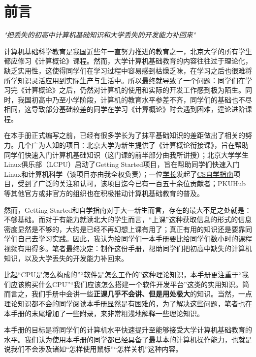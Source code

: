 \documentclass[../main.tex]{subfiles}
\begin{document}
\chapter{前言}

\begin{center}
  \emph{"把丢失的初高中计算机基础知识和大学丢失的开发能力补回来"}
\end{center}

计算机基础科学教育是我国近些年一直努力推进的教育之一，北京大学的所有学生都应修习《计算概论》课程。然而，大学计算机基础教育的内容往往过于理论化，缺乏实用性，这使得同学们在学习过程中容易感到枯燥乏味，在学习之后也很难将所学知识灵活应用到实际生产与生活中。所以最终就导致了一个问题：同学们在学习完《计算概论》之后，仍然对计算机的使用和实际的开发工作感到极为陌生。同时，我国初高中乃至小学阶段，计算机的教育水平参差不齐，同学们的基础也不尽相同，这导致部分基础较差的同学在学习《计算概论》时会遇到困难，遑论进阶课程。

在本手册正式编写之前，已经有很多学长为了抹平基础知识的差距做出了相关的努力。几个广为人知的项目：北京大学为新生提供了《计算概论衔接课》，旨在帮助同学们快速入门计算机基础知识（这门课的前半部分由我所讲授）；北京大学学生Linux俱乐部（LCPU）启动了Getting Started项目，旨在帮助同学们快速入门Linux和计算机科学（该项目亦由我全权负责）；一位\faGithub\href{https://github.com/PKUFlyingPig}{学长}发起了\href{https://csdiy.wiki/}{CS自学指南}项目，受到了广泛的关注和认可，该项目迄今已有一百五十余位贡献者；PKUHub等其他官方或非官方的组织也在积极推动计算机基础教育的普及。

然而，Getting Started和自学指南对于大一新生而言，存在的最大不足之处就是：不够基础。而对于有能力就读北大的学生而言，“上课”这种获取信息的形式的信息密度显然是不够的，大约是已经不再幻想上课有用了；真正有用的知识还是要靠同学们自己去学习实践。因此，我认为给同学们一本手册要比给同学们数小时的课程视频有用得多。笔者最终决定：制作这份手册，帮助同学们把初高中缺失的计算机知识，以及大学丢失的开发能力补回来。

比起“CPU是怎么构成的”“软件是怎么工作的”这种理论知识，本手册更注重于“我们应该购买什么CPU”“我们应该怎么搭建一个软件开发平台”这类的实用知识。简而言之，我们手册中会讲一些\textbf{正课几乎不会讲、但是用处极大}的知识。当然，一点理论知识都不会的同学阅读本手册显然是有困难的，为了解决这些问题，笔者也在本手册的末尾增加了一些附录，来非常粗浅地解释一些理论知识。

本手册的目标是将同学们的计算机水平快速提升至能够接受大学计算机基础教育的水平。我们认为使用本手册的同学都已经具备了最基本的计算机操作能力，也就是说我们不会涉及诸如“怎样使用鼠标”“怎样关机”这种内容。
\end{document}
